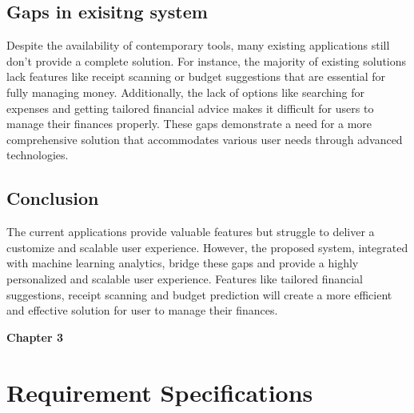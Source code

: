 \documentclass[12pt]{article}
\begin{document}
\noindent
\subsection{Gaps in exisitng system}

\vspace{0.5cm}

\noindent
\normalsize Despite the availability of contemporary tools, many existing applications still don’t provide a complete solution. For instance, the majority of existing solutions lack features like receipt scanning or budget suggestions that are essential for fully managing money. Additionally, the lack of options like searching for expenses and getting tailored financial advice makes it difficult for users to manage their finances properly. These gaps demonstrate a need for a more comprehensive solution that accommodates various user needs through advanced technologies.




\vspace{1cm} %
\noindent
\subsection{Conclusion}

\vspace{0.5cm}

\noindent
\normalsize The current applications provide valuable features but struggle to deliver a customize and scalable user experience. However, the proposed system, integrated with machine learning analytics, bridge these gaps and provide a highly personalized and scalable user experience. Features like tailored financial   suggestions, receipt scanning and budget prediction will create a more efficient and effective solution for user to manage their finances. 
\newpage
 

\vspace*{1.5cm} %

\noindent
\LARGE \textbf{Chapter 3}

\vspace{1 cm}

\noindent
\section{Requirement Specifications}
\end{document}
